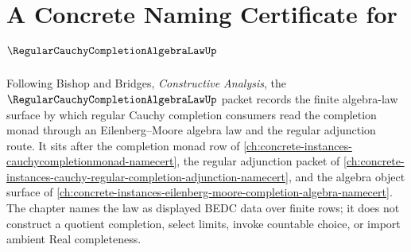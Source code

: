 \chapter{A Concrete Naming Certificate for $\RegularCauchyCompletionAlgebraLawUp$}
\label{ch:concrete-instances-regular-cauchy-completion-algebra-law-namecert}

Following Bishop and Bridges, \emph{Constructive Analysis}, the $\RegularCauchyCompletionAlgebraLawUp$ packet records the finite algebra-law surface by which regular Cauchy completion consumers read the completion monad through an Eilenberg--Moore algebra law and the regular adjunction route. It sits after the completion monad row of \autoref{ch:concrete-instances-cauchycompletionmonad-namecert}, the regular adjunction packet of \autoref{ch:concrete-instances-cauchy-regular-completion-adjunction-namecert}, and the algebra object surface of \autoref{ch:concrete-instances-eilenberg-moore-completion-algebra-namecert}. The chapter names the law as displayed BEDC data over finite rows; it does not construct a quotient completion, select limits, invoke countable choice, or import ambient Real completeness.

